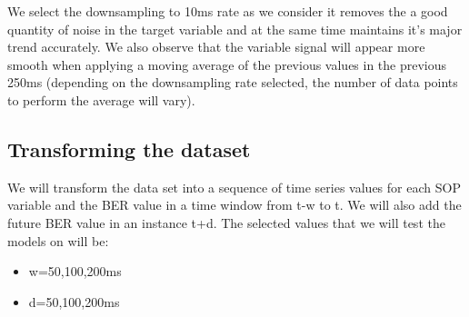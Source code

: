 \documentclass[a4paper]{article}
\begin{document}
We select the downsampling to 10ms rate as we consider it removes the a good quantity of noise in the target variable and at the same time maintains it's major trend accurately. We also observe that the variable signal will appear more smooth when applying a moving average of the previous values in the previous 250ms (depending on the downsampling rate selected, the number of data points to perform the average will vary).

\subsection{Transforming the dataset }
 We will transform the data set into a sequence of time series values for each SOP variable and the BER value in a time window from t-w to t. We will also add the future BER value in an instance t+d.
 The selected values that we will test the models on will be:
 \begin{itemize}
     \item w=50,100,200ms 
     \item d=50,100,200ms
 \end{itemize}
\end{document}
